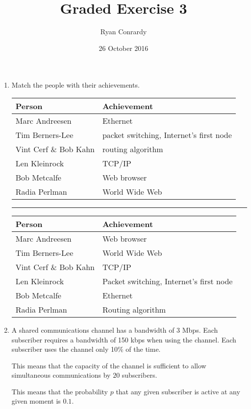 \documentclass[twoside]{article}
\title{Graded Exercise 3}
\author{Ryan Conrardy}
\date{26 October 2016}
\newenvironment{answer}
  {\vspace*{0.2cm} \rule{12cm}{0.04cm} \vspace*{0.2cm}}
  {\vspace*{0.2cm}}
\begin{document}
\maketitle

\begin{enumerate}
  \item Match the people with their achievements.

  \begin{tabular}{l|l}
    \textbf{Person} & \textbf{Achievement} \\ \hline
    Marc Andreesen & Ethernet \\
    Tim Berners-Lee & packet switching, Internet's first node \\
    Vint Cerf \& Bob Kahn & routing algorithm \\    
    Len Kleinrock & TCP/IP \\
    Bob Metcalfe & Web browser \\
    Radia Perlman & World Wide Web
    \end{tabular}

  \begin{answer}

  \begin{tabular}{l|l}
    \textbf{Person} & \textbf{Achievement} \\ \hline
    Marc Andreesen & Web browser\\
    Tim Berners-Lee &  World Wide Web \\
    Vint Cerf \& Bob Kahn & TCP/IP\\    
    Len Kleinrock & Packet switching, Internet's first node\\
    Bob Metcalfe & Ethernet \\
    Radia Perlman & Routing algorithm
    \end{tabular}

    \end{answer}

  \item A shared communications channel has a bandwidth of 3 Mbps.
    Each subscriber requires a bandwidth of 150 kbps when
    using the channel.
    Each subscriber uses the channel only 10\% of the time.

    This means that the capacity of the channel is sufficient to
    allow simultaneous communications by $20$ subscribers.

    This means that the probability $p$ that any given subscriber is active at any given moment
    is $0.1$.


\end{enumerate}
\end{document}
